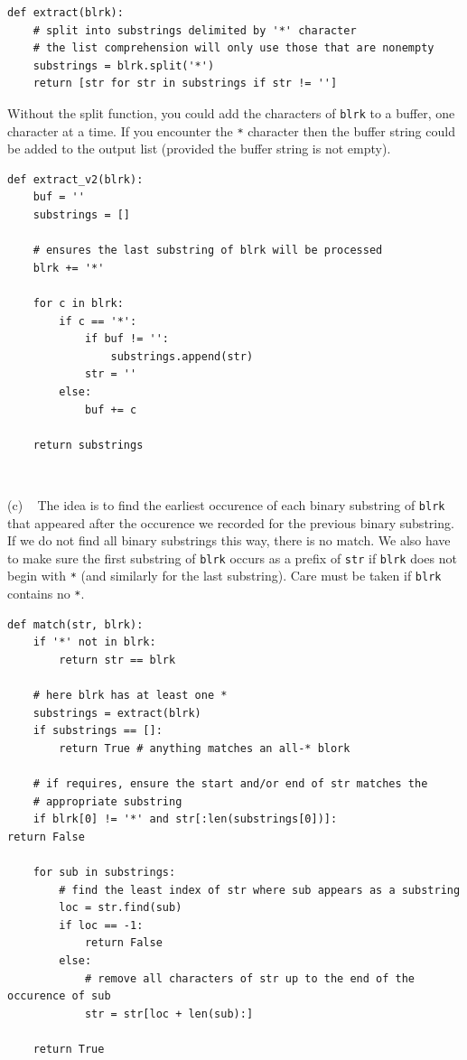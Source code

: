 \documentclass[12pt]{article}
\begin{document}
\begin{verbatim}
def extract(blrk):
    # split into substrings delimited by '*' character
    # the list comprehension will only use those that are nonempty
    substrings = blrk.split('*')
    return [str for str in substrings if str != '']
\end{verbatim}

Without the split function, you could add the characters of \texttt{blrk} to a buffer, one character at a time. If you encounter the \texttt{*} character then the buffer string
could be added to the output list (provided the buffer string is not empty).
\begin{verbatim}
def extract_v2(blrk):
    buf = ''
    substrings = []

    # ensures the last substring of blrk will be processed
    blrk += '*'
    
    for c in blrk:
        if c == '*':
            if buf != '':
                substrings.append(str)
            str = ''
        else:
            buf += c

    return substrings
\end{verbatim}
\vfill~

\newpage
{}(c) ~
The idea is to find the earliest occurence of each binary substring of \texttt{blrk} that appeared after the occurence we recorded for the previous binary substring.
If we do not find all binary substrings this way, there is no match. We also have to make sure the first substring of \texttt{blrk} occurs as a prefix of \texttt{str}
if \texttt{blrk} does not begin with \texttt{*} (and similarly for the last substring). Care must be taken if \texttt{blrk} contains no \texttt{*}.

\begin{verbatim}
def match(str, blrk):
    if '*' not in blrk:
        return str == blrk

    # here blrk has at least one *
    substrings = extract(blrk)
    if substrings == []:
        return True # anything matches an all-* blork

    # if requires, ensure the start and/or end of str matches the
    # appropriate substring
    if blrk[0] != '*' and str[:len(substrings[0])]:
return False

    for sub in substrings:
        # find the least index of str where sub appears as a substring
        loc = str.find(sub)
        if loc == -1:
            return False
        else:
            # remove all characters of str up to the end of the occurence of sub
            str = str[loc + len(sub):]

    return True

\end{verbatim}
\vfill~
\end{document}
